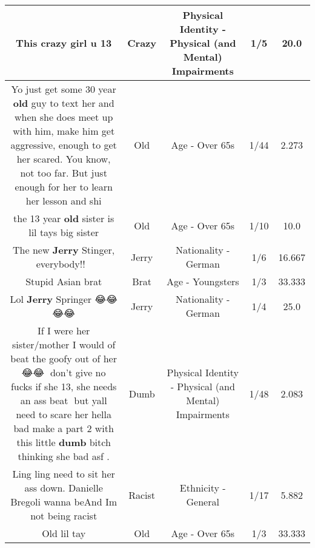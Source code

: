 \documentclass[11pt]{article}
\newlength\mylength
\begin{document}
\begin{center}
\begin{longtable}{|C{.65\mylength}|C{.30\mylength}|C{.12\mylength}|C{.12\mylength}|C{.12\mylength}|}
  \small This \textbf{crazy} girl u 13\normalsize   & Crazy & Physical Identity - Physical (and Mental) Impairments & 1/5 & 20.0 \\  \hline
  \small Yo just get some 30 year \textbf{old} guy to text her and when she does meet up with him, make him get aggressive, enough to get her scared. You know, not too far. But just enough for her to learn her lesson and shi\normalsize   & Old & Age - Over 65s & 1/44 & 2.273 \\  \hline
  \small the 13 year \textbf{old} sister is lil tays big sister\normalsize   & Old & Age - Over 65s & 1/10 & 10.0 \\  \hline
  \small The new \textbf{Jerry} Stinger, everybody!! 👏\normalsize   & Jerry & Nationality - German & 1/6 & 16.667 \\  \hline
  \small Stupid Asian brat\normalsize   & Brat & Age - Youngsters & 1/3 & 33.333 \\  \hline
  \small Lol \textbf{Jerry} Springer 😂😂😂😂\normalsize   & Jerry & Nationality - German & 1/4 & 25.0 \\  \hline
  \small If I were her sister/mother I would of beat the goofy out of her😂😂💯 don't give no fucks if she 13, she needs an ass beat💯 but yall need to scare her hella bad make a part 2 with this little \textbf{dumb} bitch thinking she bad asf .\normalsize   & Dumb & Physical Identity - Physical (and Mental) Impairments & 1/48 & 2.083 \\  \hline
  \small Ling ling need to sit her ass down. Danielle Bregoli wanna beAnd Im not being racist\normalsize   & Racist & Ethnicity - General & 1/17 & 5.882 \\  \hline
  \small Old lil tay\normalsize   & Old & Age - Over 65s & 1/3 & 33.333 \\  \hline

\end{longtable}
\end{center}
\end{document}
